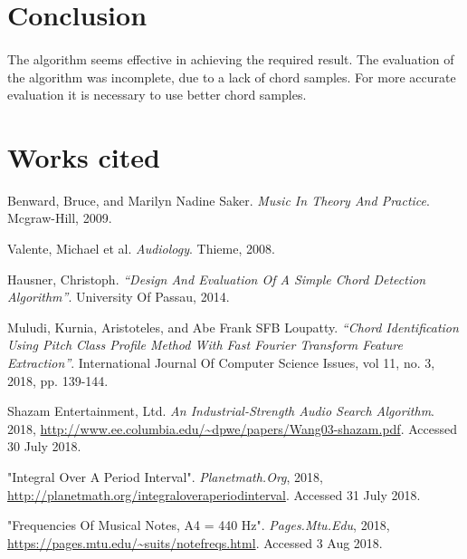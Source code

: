 \documentclass{article}
\begin{document}
\section{Conclusion}
\paragraph*{}
The algorithm seems effective in achieving the required result. The evaluation 
of the algorithm was incomplete, due to a lack of chord samples. For more 
accurate evaluation it is necessary to use better chord samples.

\pagebreak
\section*{Works cited}

Benward, Bruce, and Marilyn Nadine Saker. 
\textit{Music In Theory And Practice}. Mcgraw-Hill, 2009.

Valente, Michael et al. \textit{Audiology}. Thieme, 2008.

Hausner, Christoph. \textit{``Design And Evaluation Of A Simple Chord 
Detection Algorithm''}. University Of Passau, 2014.

Muludi, Kurnia, Aristoteles, and Abe Frank SFB Loupatty. \textit{``Chord 
Identification Using Pitch Class Profile Method With Fast Fourier Transform 
Feature Extraction''}. International Journal Of Computer Science Issues, vol 
11, no. 3, 2018, pp. 139-144.

Shazam Entertainment, Ltd. \textit{An Industrial-Strength Audio Search 
Algorithm}. 2018, 
\url{http://www.ee.columbia.edu/~dpwe/papers/Wang03-shazam.pdf}. 
Accessed 30 July 2018.

"Integral Over A Period Interval". \textit{Planetmath.Org}, 2018, 
\url{http://planetmath.org/integraloveraperiodinterval}. Accessed 31 July 2018.

"Frequencies Of Musical Notes, A4 = 440 Hz". \textit{Pages.Mtu.Edu}, 2018, 
\url{https://pages.mtu.edu/~suits/notefreqs.html}. Accessed 3 Aug 2018.

\end{document}
